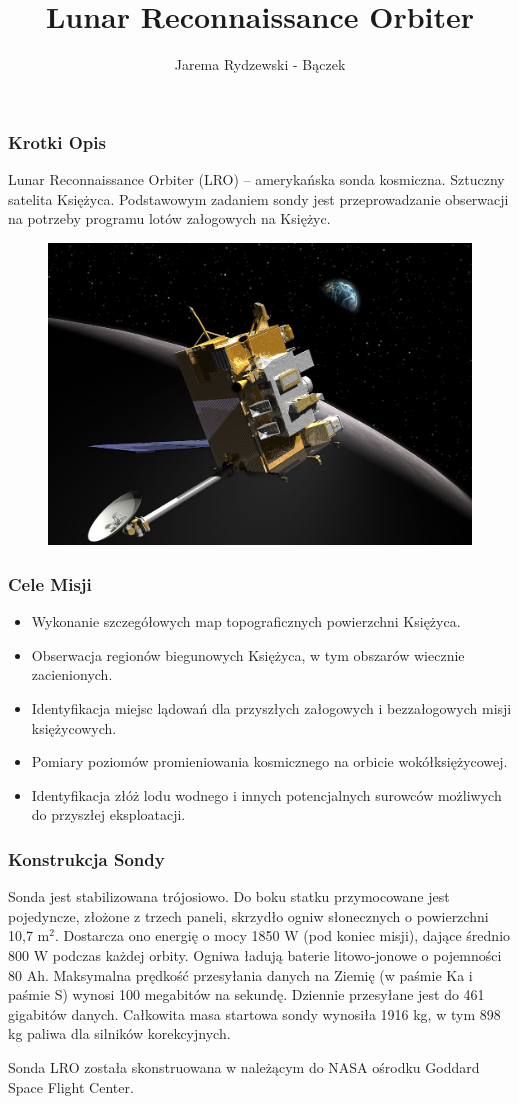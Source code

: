 \documentclass[]{beamer}
\author{Jarema Rydzewski - Bączek}
\title{Lunar Reconnaissance Orbiter}
\date{}
\begin{document}
\frame
{
\maketitle
}
\frame
{
\frametitle{Krotki Opis}
Lunar Reconnaissance Orbiter (LRO) – amerykańska sonda kosmiczna. Sztuczny satelita Księżyca. Podstawowym zadaniem sondy jest przeprowadzanie obserwacji na potrzeby programu lotów załogowych na Księżyc.
\begin{center}
\begin{figure}
\includegraphics[scale=0.65]{sonda.jpg}
\end{figure}
\end{center}
}
\frame
{
\frametitle{Cele Misji}
\begin{itemize}
\item Wykonanie szczegółowych map topograficznych powierzchni Księżyca.
\item Obserwacja regionów biegunowych Księżyca, w tym obszarów wiecznie zacienionych.
\item Identyfikacja miejsc lądowań dla przyszłych załogowych i bezzałogowych misji księżycowych.
\item Pomiary poziomów promieniowania kosmicznego na orbicie wokółksiężycowej.
\item Identyfikacja złóż lodu wodnego i innych potencjalnych surowców możliwych do przyszłej eksploatacji.
\end{itemize}
}
\frame
{
\frametitle{Konstrukcja Sondy}
Sonda jest stabilizowana trójosiowo. Do boku statku przymocowane jest pojedyncze, złożone z trzech paneli, skrzydło ogniw słonecznych o powierzchni 10,7 m$^2$. Dostarcza ono energię o mocy 1850 W (pod koniec misji), dające średnio 800 W podczas każdej orbity. Ogniwa ładują baterie litowo-jonowe o pojemności 80 Ah. Maksymalna prędkość przesyłania danych na Ziemię (w paśmie Ka i paśmie S) wynosi 100 megabitów na sekundę. Dziennie przesyłane jest do 461 gigabitów danych. Całkowita masa startowa sondy wynosiła 1916 kg, w tym 898 kg paliwa dla silników korekcyjnych.

Sonda LRO została skonstruowana w należącym do NASA ośrodku Goddard Space Flight Center.
}
\end{document}

